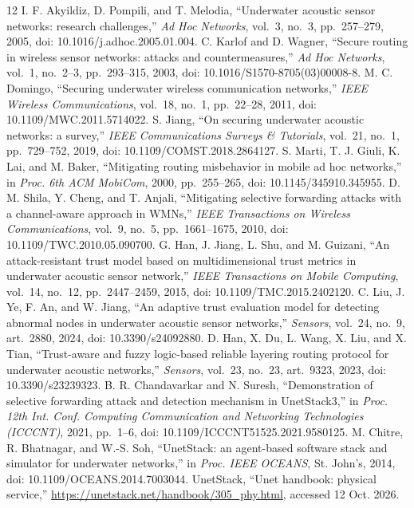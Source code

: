 \documentclass[conference]{IEEEtran}
\begin{document}
\begin{thebibliography}{12}
 I. F. Akyildiz, D. Pompili, and T. Melodia, ``Underwater acoustic sensor networks: research challenges,'' \emph{Ad Hoc Networks}, vol.~3, no.~3, pp.~257--279, 2005, doi: 10.1016/j.adhoc.2005.01.004.
 C. Karlof and D. Wagner, ``Secure routing in wireless sensor networks: attacks and countermeasures,'' \emph{Ad Hoc Networks}, vol.~1, no.~2--3, pp.~293--315, 2003, doi: 10.1016/S1570-8705(03)00008-8.
 M. C. Domingo, ``Securing underwater wireless communication networks,'' \emph{IEEE Wireless Communications}, vol.~18, no.~1, pp.~22--28, 2011, doi: 10.1109/MWC.2011.5714022.
 S. Jiang, ``On securing underwater acoustic networks: a survey,'' \emph{IEEE Communications Surveys \& Tutorials}, vol.~21, no.~1, pp.~729--752, 2019, doi: 10.1109/COMST.2018.2864127.
 S. Marti, T. J. Giuli, K. Lai, and M. Baker, ``Mitigating routing misbehavior in mobile ad hoc networks,'' in \emph{Proc. 6th ACM MobiCom}, 2000, pp.~255--265, doi: 10.1145/345910.345955.
 D. M. Shila, Y. Cheng, and T. Anjali, ``Mitigating selective forwarding attacks with a channel-aware approach in WMNs,'' \emph{IEEE Transactions on Wireless Communications}, vol.~9, no.~5, pp.~1661--1675, 2010, doi: 10.1109/TWC.2010.05.090700.
 G. Han, J. Jiang, L. Shu, and M. Guizani, ``An attack-resistant trust model based on multidimensional trust metrics in underwater acoustic sensor network,'' \emph{IEEE Transactions on Mobile Computing}, vol.~14, no.~12, pp.~2447--2459, 2015, doi: 10.1109/TMC.2015.2402120.
 C. Liu, J. Ye, F. An, and W. Jiang, ``An adaptive trust evaluation model for detecting abnormal nodes in underwater acoustic sensor networks,'' \emph{Sensors}, vol.~24, no.~9, art.~2880, 2024, doi: 10.3390/s24092880.
 D. Han, X. Du, L. Wang, X. Liu, and X. Tian, ``Trust-aware and fuzzy logic-based reliable layering routing protocol for underwater acoustic networks,'' \emph{Sensors}, vol.~23, no.~23, art.~9323, 2023, doi: 10.3390/s23239323.
 B. R. Chandavarkar and N. Suresh, ``Demonstration of selective forwarding attack and detection mechanism in UnetStack3,'' in \emph{Proc. 12th Int. Conf. Computing Communication and Networking Technologies (ICCCNT)}, 2021, pp.~1--6, doi: 10.1109/ICCCNT51525.2021.9580125.
 M. Chitre, R. Bhatnagar, and W.-S. Soh, ``UnetStack: an agent-based software stack and simulator for underwater networks,'' in \emph{Proc. IEEE OCEANS}, St. John's, 2014, doi: 10.1109/OCEANS.2014.7003044.
 UnetStack, ``Unet handbook: physical service,'' \url{https://unetstack.net/handbook/305_phy.html}, accessed 12 Oct. 2026.
\end{thebibliography}
\end{document}
